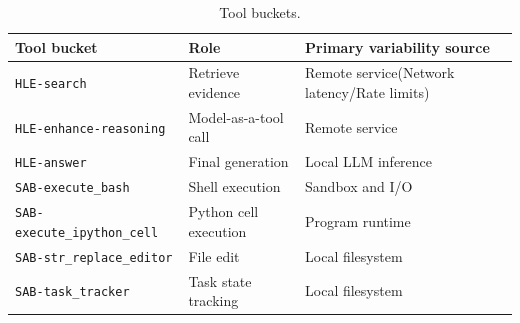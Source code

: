 \begin{table}[!htbp]
\centering
\small
\setlength{\tabcolsep}{8pt}
\begin{tabular}{l l l}
\toprule
\textbf{Tool bucket} & \textbf{Role} & \textbf{Primary variability source} \\
\midrule
\texttt{HLE-search} & Retrieve evidence & Remote service(Network latency/Rate limits) \\
\texttt{HLE-enhance-reasoning} & Model-as-a-tool call & Remote service \\
\texttt{HLE-answer} & Final generation & Local LLM inference \\
\midrule
\texttt{SAB-execute\_bash} & Shell execution & Sandbox and I/O \\
\texttt{SAB-execute\_ipython\_cell} & Python cell execution & Program runtime \\
\texttt{SAB-str\_replace\_editor} & File edit & Local filesystem \\
\texttt{SAB-task\_tracker} & Task state tracking & Local filesystem \\
\bottomrule
\end{tabular}
\vspace{6pt}
\caption{Tool buckets.}
\label{tab:tool-buckets}
\end{table}





